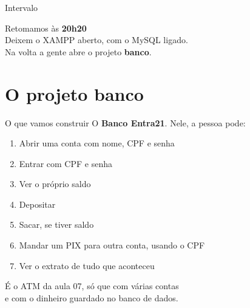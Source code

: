 \documentclass[aspectratio=169,11pt]{beamer}
\begin{document}
\begin{frame}{Intervalo}
  \begin{center}
    \Large Retomamos às \textbf{20h20}\\[0.8em]
    \normalsize
    Deixem o XAMPP aberto, com o MySQL ligado.\\
    Na volta a gente abre o projeto \textbf{banco}.
  \end{center}
\end{frame}

\section{O projeto banco}

\begin{frame}{O que vamos construir}
  O \textbf{Banco Entra21}. Nele, a pessoa pode:

  \vspace{0.5em}
  \begin{enumerate}
    \item Abrir uma conta com nome, CPF e senha
    \item Entrar com CPF e senha
    \item Ver o próprio saldo
    \item Depositar
    \item Sacar, se tiver saldo
    \item Mandar um PIX para outra conta, usando o CPF
    \item Ver o extrato de tudo que aconteceu
  \end{enumerate}

  \vspace{0.5em}
  É o ATM da aula 07, só que com várias contas\\
  e com o dinheiro guardado no banco de dados.
\end{frame}
\end{document}
